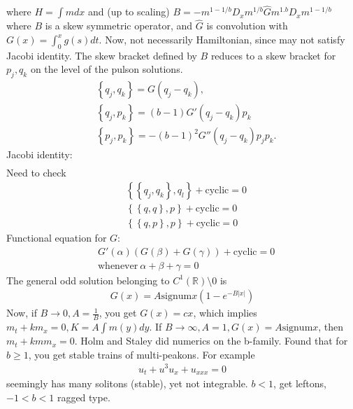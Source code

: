 \documentclass[12pt,reqno]{amsart}
\numberwithin{equation}{section}  %
\newcommand{\rr}{\mathbb{R}}
\newcommand{\wh}{\widehat}
\begin{document}
%
%
where $H = \int m dx$ and (up to scaling)
$B = -m^{1 - 1/b} D_{x} m^{1/b} \wh{G} m^{1.b}
D_{x} m^{1 - 1/b}$ where $B$ is a skew symmetric operator, and $\wh{G}$ is
convolution with $G(x) = \int_{0}^{x} g(s) dt$. 
Now, not necessarily Hamiltonian, since may not satisfy Jacobi identity.        
The skew bracket defined by $B$ reduces to a skew bracket for $p_{j},
q_{k}$ on the level of the pulson solutions.
%
%
\begin{equation*}
    \begin{split}
	& \left\{ q_{j}, q_{k} \right\} = G(q_{j} - q_{k}),
	\\
	& \left\{ q_{j}, p_{k} \right\} = (b-1) G'(q_{j} - q_{k})p_{k}
	\\
	& \left\{ p_{j}, p_{k} \right\} = -(b-1)^{2} G''(q_{j} - q_{k})p_{j}
	p_{k}.
    \end{split}
\end{equation*}
%
%
Jacobi identity:
%
%
\begin{equation*}
    \begin{split}
    \end{split}
\end{equation*}
%
%
Need to check 
%
%
\begin{equation*}
    \begin{split}
	& \left\{ \left\{ q_{j}, q_{k} \right\}, q_{l} \right\} + \text{cyclic} = 0
	\\
	& \left\{ \left\{ q, q \right\}, p \right\} + \text{cyclic} = 0
	\\
	& \left\{ \left\{ q, p \right\}, p \right\} + \text{cyclic} = 0
    \end{split}
\end{equation*}
%
%
Functional equation for $G$:
%
%
\begin{equation*}
    \begin{split}
	& G'(\alpha)(G(\beta) + G(\gamma)) + \text{cyclic} = 0
	\\
	&  \text{whenever} \ \alpha + \beta + \gamma =0
    \end{split}
\end{equation*}
%
%
The general odd solution belonging to $C^{1}(\rr)\setminus 0$ is
%
%
\begin{equation*}
    \begin{split}
	G(x) = A \text{signum} x(1 - e^{-B| x |})
    \end{split}
\end{equation*}
%
%
Now, if $B \to 0, A = \frac{1}{B}$, you get $G(x) = cx$, which implies
$m_{t} + k m_{x} = 0, K = A \int m(y) dy$. If $B \to \infty, A=1, G(x) = A
\text{signum} x$, then $m_{t} + kmm_{x}=0$. Holm and Staley did numerics on the
b-family. Found that for $b \ge 1$, you get stable trains of multi-peakons. For
example
%
%
\begin{equation*}
    \begin{split}
	u_{t} + u^{3} u_{x} + u_{xxx} = 0
    \end{split}
\end{equation*}
%
%
seemingly has many solitons (stable), yet not integrable. $b < 1$, get leftons,
$-1 < b < 1$ ragged type.
\end{document}
